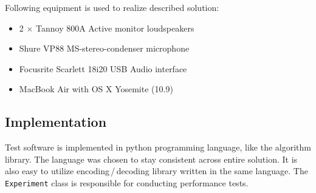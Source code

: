 \clearpage

Following equipment is used to realize described solution:
\begin{itemize}
\item 2 $\times$ Tannoy 800A Active monitor loudspeakers
\item Shure VP88 MS-stereo-condenser microphone
\item Focusrite Scarlett 18i20 USB Audio interface
\item MacBook Air with OS X Yosemite (10.9)
\end{itemize}

\subsection{Implementation}

Test software is implemented in python programming language, like the algorithm library. The language was chosen to stay consistent across entire solution.
It is also easy to utilize encoding\,/\,decoding library written in the same language.
The \verb|Experiment| class is responsible for conducting performance tests.

